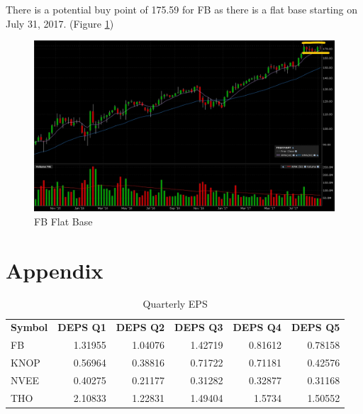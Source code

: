 \documentclass{article}
\begin{document}
There is a potential buy point of 175.59 for FB as there is a flat base starting on July 31, 2017. (Figure \ref{fig:FBFlatBase})

\begin{figure}[h]
\centering
\includegraphics[width=\textwidth]{InkedFBFlatBaseLI.png}
\caption{FB Flat Base}
\label{fig:FBFlatBase}
\end{figure}

\section{Appendix}
\begin{table}[htbp]
  \caption{Quarterly EPS}
    \begin{tabular}{lrrrrr}
    \textbf{Symbol} & \multicolumn{1}{l}{\textbf{DEPS Q1}} & \multicolumn{1}{l}{\textbf{DEPS Q2}} & \multicolumn{1}{l}{\textbf{DEPS Q3}} & \multicolumn{1}{l}{\textbf{DEPS Q4}} & \multicolumn{1}{l}{\textbf{DEPS Q5}} \\
    FB    & 1.31955 & 1.04076 & 1.42719 & 0.81612 & 0.78158 \\
    KNOP  & 0.56964 & 0.38816 & 0.71722 & 0.71181 & 0.42576 \\
    NVEE  & 0.40275 & 0.21177 & 0.31282 & 0.32877 & 0.31168 \\
    THO   & 2.10833 & 1.22831 & 1.49404 & 1.5734 & 1.50552 \\
    \end{tabular}%
  \label{tab:addlabel}%
\end{table}%
\end{document}
